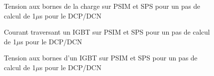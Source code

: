\begin{figure}[htb]
\caption{Tension aux bornes de la charge sur PSIM et SPS pour un pas de calcul de 1$\mu$s pour le DCP/DCN}
\label{DC_ch_ten_1}
\end{figure}


\begin{figure}[htb]
\caption{Courant traversant un IGBT sur PSIM et SPS pour un pas de calcul de 1$\mu$s pour le DCP/DCN}
\label{DC_IG_cou_1}
\end{figure}


\begin{figure}[htb]
\caption{Tension aux bornes d'un IGBT sur PSIM et SPS pour un pas de calcul de 1$\mu$s pour le DCP/DCN}
\label{DC_IG_ten_1}
\end{figure}


